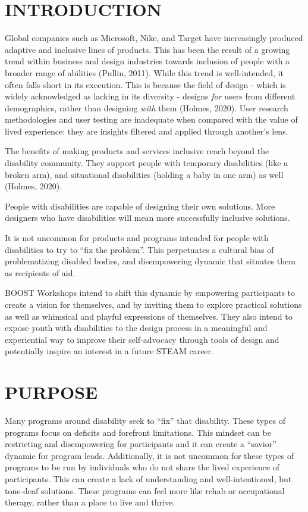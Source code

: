 \documentclass[11.5pt]{sig-alternate} %
\begin{document}
\begin{large}
\section*{INTRODUCTION}

Global companies such as Microsoft, Nike, and Target have increasingly produced adaptive and inclusive lines of products. This has been the result of a growing trend within business and design industries towards inclusion of people with a broader range of abilities (Pullin, 2011). While this trend is well-intended, it often falls short in its execution. This is because the field of design - which is widely acknowledged as lacking in its diversity - designs \textit{for} users from different demographics, rather than designing \textit{with} them (Holmes, 2020). User research methodologies and user testing are inadequate when compared with the value of lived experience: they are insights filtered and applied through another’s lens.    

The benefits of making products and services inclusive reach beyond the disability community. They support people with temporary disabilities (like a broken arm), and situational disabilities (holding a baby in one arm) as well (Holmes, 2020). 

People with disabilities are capable of designing their own solutions. More designers who have disabilities will mean more successfully inclusive solutions.    

It is not uncommon for products and programs intended for people with disabilities to try to “fix the problem”. This perpetuates a cultural bias of problematizing disabled bodies, and disempowering dynamic that situates them as recipients of aid. 
 
BOOST Workshops intend to shift this dynamic by empowering participants to create a vision for themselves, and by inviting them to explore practical solutions as well as whimsical and playful expressions of themselves. They also intend to expose youth with disabilities to the design process in a meaningful and experiential way to improve their self-advocacy through tools of design and potentially inspire an interest in a future STEAM career.    

\section*{PURPOSE}

Many programs around disability seek to “fix” that disability. These types of programs focus on deficits and forefront limitations. This mindset can be restricting and disempowering for participants and it can create a “savior” dynamic for program leads. Additionally, it is not uncommon for these types of programs to be run by individuals who do not share the lived experience of participants. This can create a lack of understanding and well-intentioned, but tone-deaf solutions. These programs can feel more like rehab or occupational therapy, rather than a place to live and thrive.    


\end{large}
\end{document}
